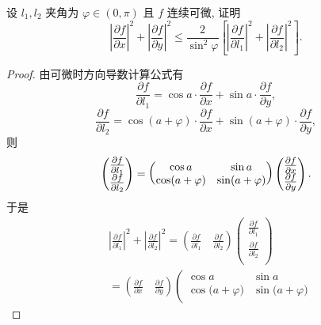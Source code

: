 \documentclass[../../main.tex]{subfiles}%
\begin{document}
\begin{example}
设 \( l_1, l_2 \) 夹角为 \( \varphi \in (0, \pi) \) 且 \( f \) 连续可微, 证明
\[
\left| \frac{\partial f}{\partial x} \right|^2 + \left| \frac{\partial f}{\partial y} \right|^2 \leqslant \frac{2}{\sin^2 \varphi} \left[ \left| \frac{\partial f}{\partial l_1} \right|^2 + \left| \frac{\partial f}{\partial l_2} \right|^2 \right] .
\]
\end{example}
\begin{proof}
由可微时方向导数计算公式有
\[
\frac{\partial f}{\partial l_1} = \cos a \cdot \frac{\partial f}{\partial x} + \sin a \cdot \frac{\partial f}{\partial y},
\]
\[
\frac{\partial f}{\partial l_2} = \cos (a + \varphi) \cdot \frac{\partial f}{\partial x} + \sin (a + \varphi) \cdot \frac{\partial f}{\partial y},
\]
则
\begin{align*}
\begin{large}
\begin{pmatrix}
{\textstyle \frac{\partial f}{\partial l_1} }\\
{\textstyle \frac{\partial f}{\partial l_2}}
\end{pmatrix}
\end{large}
=
\begin{pmatrix}
\cos a & \sin a \\
\cos (a + \varphi) & \sin (a + \varphi)
\end{pmatrix}
\begin{large}
\begin{pmatrix}
{\textstyle \frac{\partial f}{\partial x}} \\
{\textstyle \frac{\partial f}{\partial y}}
\end{pmatrix}
\end{large}.
\end{align*}
于是
\[
\begin{aligned}
&\left| \frac{\partial f}{\partial l_1} \right|^2+\left| \frac{\partial f}{\partial l_2} \right|^2=\left( \frac{\partial f}{\partial l_1}\quad \frac{\partial f}{\partial l_2} \right) \left( \begin{array}{c}
\frac{\partial f}{\partial l_1}\\
\frac{\partial f}{\partial l_2}\\
\end{array} \right) 
\\
&=\left( \frac{\partial f}{\partial x}\quad \frac{\partial f}{\partial y} \right) \left( \begin{matrix}
\cos a&		\sin a\\
\cos\mathrm{(}a+\varphi )&		\sin\mathrm{(}a+\varphi )\\

\end{matrix}
\end{aligned}\]
\end{proof}
\end{document}
